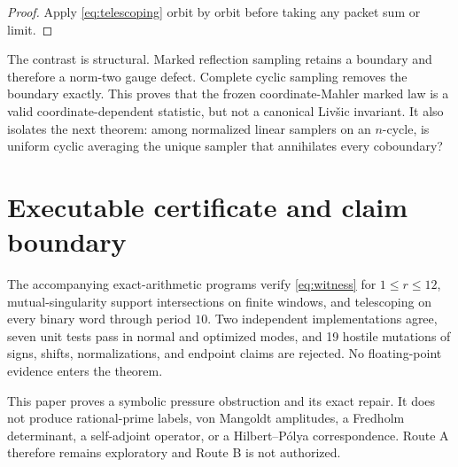 \documentclass[11pt]{article}
\begin{document}
\begin{proof}
Apply \eqref{eq:telescoping} orbit by orbit before taking any packet sum or
limit.
\end{proof}

The contrast is structural.  Marked reflection sampling retains a boundary
and therefore a norm-two gauge defect.  Complete cyclic sampling removes the
boundary exactly.  This proves that the frozen coordinate-Mahler marked law
is a valid coordinate-dependent statistic, but not a canonical Liv\v{s}ic
invariant.  It also isolates the next theorem: among normalized linear
samplers on an $n$-cycle, is uniform cyclic averaging the unique sampler
that annihilates every coboundary?

\section{Executable certificate and claim boundary}

The accompanying exact-arithmetic programs verify \eqref{eq:witness} for
$1\leq r\leq12$, mutual-singularity support intersections on finite windows,
and telescoping on every binary word through period $10$.  Two independent
implementations agree, seven unit tests pass in normal and optimized modes,
and 19 hostile mutations of signs, shifts, normalizations, and endpoint
claims are rejected.  No floating-point evidence enters the theorem.

This paper proves a symbolic pressure obstruction and its exact repair.  It
does not produce rational-prime labels, von Mangoldt amplitudes, a Fredholm
determinant, a self-adjoint operator, or a Hilbert--P\'olya correspondence.
Route A therefore remains exploratory and Route B is not authorized.



\end{document}
